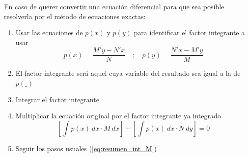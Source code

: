 En caso de querer convertir una ecuación diferencial para que sea posible resolverla por el método de ecuaciones exactas:

\begin{enumerate}
    \item Usar las ecuaciones de $p(x)$ y $p(y)$ para identificar el factor integrante a usar
        \begin{equation*}
            p(x) = \frac{M'y-N'x}{N} \quad ; \quad p(y) = \frac{N'x-M'y}{M}
        \end{equation*}
    
    \item El factor integrante será aquel cuya variable del resultado sea igual a la de $p(\_)$

    \item Integrar el factor integrante

    \item Multiplicar la ecuación original por el factor integrante ya integrado
        \begin{equation*}
            \left[ \int{p(x) \ dx} \cdot M \ dx \right] + \left[ \int{p(x) \ dx} \cdot N \ dy \right] = 0
        \end{equation*}

    \item Seguir los pasos usuales (\autoref{eq:resumen_int_M})

\end{enumerate}